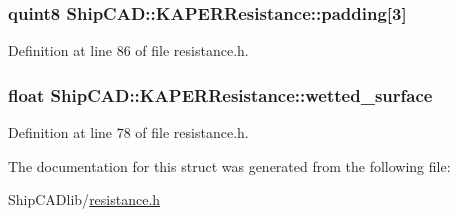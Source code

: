 \subsubsection[{\texorpdfstring{padding}{padding}}]{\setlength{\rightskip}{0pt plus 5cm}quint8 Ship\+C\+A\+D\+::\+K\+A\+P\+E\+R\+Resistance\+::padding\mbox{[}3\mbox{]}}\hypertarget{structShipCAD_1_1KAPERResistance_a6ff5b219f299159cf66bc450d2ac2a73}{}\label{structShipCAD_1_1KAPERResistance_a6ff5b219f299159cf66bc450d2ac2a73}


Definition at line 86 of file resistance.\+h.

\subsubsection[{\texorpdfstring{wetted\+\_\+surface}{wetted_surface}}]{\setlength{\rightskip}{0pt plus 5cm}float Ship\+C\+A\+D\+::\+K\+A\+P\+E\+R\+Resistance\+::wetted\+\_\+surface}\hypertarget{structShipCAD_1_1KAPERResistance_a912090d77ad755a5b1506372c24540bc}{}\label{structShipCAD_1_1KAPERResistance_a912090d77ad755a5b1506372c24540bc}


Definition at line 78 of file resistance.\+h.



The documentation for this struct was generated from the following file\+:\begin{DoxyCompactItemize}
\item 
Ship\+C\+A\+Dlib/\hyperlink{resistance_8h}{resistance.\+h}\end{DoxyCompactItemize}
